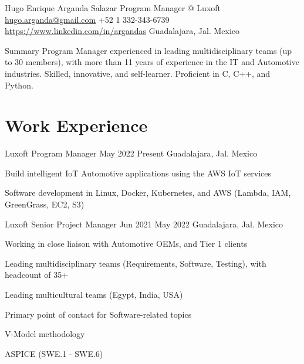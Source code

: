 \documentclass{resume} %
\begin{document}

\customheader
    {Hugo Enrique Arganda Salazar}
    {Program Manager @ Luxoft}
    {\href{mailto:hugo.arganda@gmail.com}{hugo.arganda@gmail.com}}
    {+52 1 332-343-6739}
    {\href{https://www.linkedin.com/in/argandas}{https://www.linkedin.com/in/argandas}}
    {Guadalajara, Jal. Mexico}



\summary
{Summary}
    {Program Manager experienced in leading multidisciplinary teams (up to 30 members), with more than 11 years of experience in the IT and Automotive industries. Skilled, innovative, and self-learner. Proficient in C, C++, and Python.}



\section{Work Experience}


\job
    {Luxoft}
    {Program Manager}
    {May 2022}
    {Present}
    {Guadalajara, Jal. Mexico}
    {
    \begin{itemize-bullets}
    \item{Build intelligent IoT Automotive applications using the AWS IoT services}
    \item{Software development in Linux, Docker, Kubernetes, and AWS (Lambda, IAM, GreenGrass, EC2, S3)}
    \end{itemize-bullets}
    }


\job
    {Luxoft}
    {Senior Project Manager}
    {Jun 2021}
    {May 2022}
    {Guadalajara, Jal. Mexico}
    {
    \begin{itemize-bullets}
    \item{Working in close liaison with Automotive OEMs, and Tier 1 clients}
    \item{Leading multidisciplinary teams (Requirements, Software, Testing), with headcount of 35+}
    \item{Leading multicultural teams (Egypt, India, USA)}
    \item{Primary point of contact for Software-related topics}
    \item{V-Model methodology}
    \item{ASPICE (SWE.1 - SWE.6)}
    \end{itemize-bullets}
    }
\end{document}
